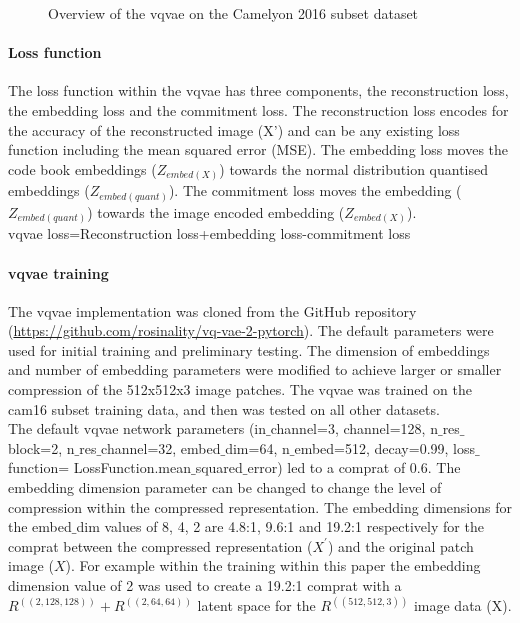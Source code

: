 \documentclass[review]{elsarticle}
\begin{document}

\begin{figure}
    \centering
    \caption{Overview of the \gls{vqvae} on the Camelyon 2016 subset dataset}
    \label{fig:VQVAE_camelyon_2016_overview_diagram}
\end{figure}

\paragraph{Loss function} The loss function within the \gls{vqvae} has three components, the reconstruction loss, the embedding loss and the commitment loss. The reconstruction loss encodes for the accuracy of the reconstructed image (X') and can be any existing loss function including the mean squared error (MSE). The embedding loss moves the code book embeddings ($Z_{embed(X)}$) towards the normal distribution quantised embeddings ($Z_{embed(quant)}$). The commitment loss moves the embedding ($Z_{embed(quant)}$) towards the image encoded embedding ($Z_{embed(X)}$). \\
    \gls{vqvae} loss=Reconstruction loss+embedding loss-commitment loss
    
\paragraph{\gls{vqvae} training} The \gls{vqvae} implementation was cloned from the GitHub repository (\url{https://github.com/rosinality/vq-vae-2-pytorch}). The default parameters were used for initial training and preliminary testing. The dimension of embeddings and number of embedding parameters were modified to achieve larger or smaller compression of the 512x512x3 image patches. The \gls{vqvae} was trained on the \gls{cam16} subset training data, and then was tested on all other datasets.\\
The default \gls{vqvae} network parameters (in$\_$channel=3, channel=128, n$\_$res$\_$block=2, n$\_$res$\_$channel=32, embed$\_$dim=64, n$\_$embed=512, decay=0.99, loss$\_$function= LossFunction.mean$\_$squared$\_$error) led to a \gls{comprat} of 0.6. The embedding dimension parameter can be changed to change the level of compression within the compressed representation. The embedding dimensions for the embed$\_$dim values of 8, 4, 2 are 4.8:1, 9.6:1 and 19.2:1 respectively for the \gls{comprat} between the compressed representation ($X^{'}$) and the original patch image ($X$). For example within the training within this paper the embedding dimension value of 2 was used to create a 19.2:1 \gls{comprat} with a $R^{((2,128,128))}+R^{((2,64,64))}$ latent space for the $R^{((512,512,3))}$ image data (X).
\end{document}
